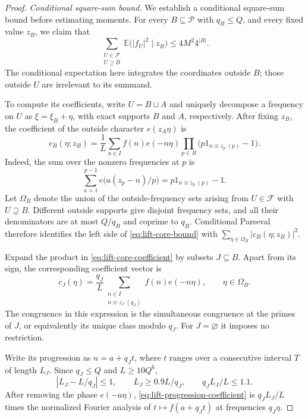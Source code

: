 \begin{proof}
\textit{Conditional square-sum bound.}\quad
We establish a conditional square-sum bound before estimating moments.
For every \(B\subseteq\mathcal P\) with \(q_B\le Q\), and every
fixed value \(z_B\), we claim that
\begin{equation}
 \sum_{\substack{U\in\mathcal F\\U\supseteq B}}
   \mathbb E\bigl(|f_U|^2\mid z_B\bigr)
 \le 4M^2 4^{|B|}.
 \label{eq:lift-core-bound}
\end{equation}
The conditional expectation here integrates the coordinates outside
\(B\); those outside \(U\) are irrelevant to its summand.

To compute its coefficients, write \(U=B\sqcup A\) and uniquely
decompose a frequency on \(U\) as \(\xi=\xi_B+\eta\), with exact
supports \(B\) and \(A\), respectively.  After fixing \(z_B\), the
coefficient of the outside character \(e(z_A\eta)\) is
\begin{equation}
 c_B(\eta;z_B)=\frac1L\sum_{n\in I}f(n)e(-n\eta)
       \prod_{p\in B}\bigl(p1_{n\equiv z_p\ (p)}-1\bigr).
 \label{eq:lift-core-coefficient}
\end{equation}
Indeed, the sum over the nonzero frequencies at \(p\) is
\[
 \sum_{a=1}^{p-1}e\bigl(a(z_p-n)/p\bigr)
   =p1_{n\equiv z_p\ (p)}-1.
\]
Let \(\Omega_B\) denote the union of the outside-frequency sets
arising from \(U\in\mathcal F\) with \(U\supseteq B\).
Different outside supports give disjoint frequency sets, and all their
denominators are at most \(Q/q_B\) and coprime to \(q_B\).
Conditional Parseval therefore identifies the left side of
\eqref{eq:lift-core-bound} with
\(\sum_{\eta\in\Omega_B}|c_B(\eta;z_B)|^2\).

Expand the product in \eqref{eq:lift-core-coefficient} by subsets
\(J\subseteq B\).  Apart from its sign, the corresponding coefficient
vector is
\begin{equation}
 c_J(\eta)=\frac{q_J}{L}
   \sum_{\substack{n\in I\\n\equiv z_J\ (q_J)}}f(n)e(-n\eta),
 \qquad \eta\in\Omega_B.
 \label{eq:lift-progression-coefficient}
\end{equation}
The congruence in this expression is the simultaneous congruence at
the primes of \(J\), or equivalently its unique class modulo \(q_J\).
For \(J=\varnothing\) it imposes no restriction.

Write its progression as \(n=a+q_Jt\), where \(t\) ranges over a
consecutive interval \(T\) of length \(L_J\).  Since
\(q_J\le Q\) and \(L\ge10Q^6\),
\[
 |L_J-L/q_J|\le1,
 \qquad L_J\ge0.9L/q_J,
 \qquad q_JL_J/L\le1.1.
\]
After removing the phase \(e(-a\eta)\),
\eqref{eq:lift-progression-coefficient} is \(q_JL_J/L\) times the
normalized Fourier analysis of \(t\mapsto f(a+q_Jt)\) at frequencies
\(q_J\eta\).


\end{proof}
